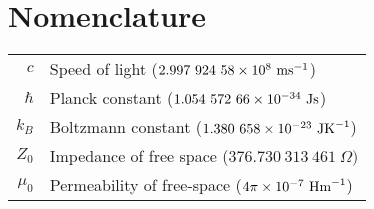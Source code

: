 \chapter*{Nomenclature} 

\begin{tabular}{rl}
$c$ & Speed of light ($2.997\ 924\ 58 \times 10^{8}\ \mbox{ms}^{-1}$) \\
$\hbar$ & Planck constant ($1.054\ 572\ 66\times 10^{-34}\ \mbox{Js}$) \\
$k_B$ & Boltzmann constant  ($1.380\ 658\times 10^{-23}\ \mbox{JK}^{-1} $) \\
$Z_0$ &Impedance of free space  ($376.730\ 313\ 461\ \Omega) $ \\
$\mu_0$ &Permeability of free-space ($4\pi\times 10^{-7}\ \mbox{Hm}^{-1}$) \\
\end{tabular}